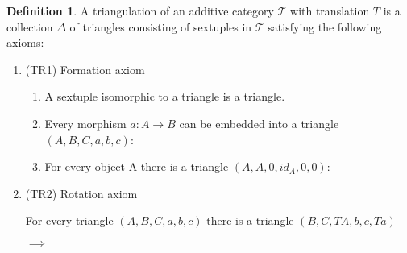 \documentclass[12pt]{article}
\theoremstyle{definition}
\newtheorem{definition}{Definition}[section]
\theoremstyle{remark}
\begin{document}
            \begin{definition}
                A triangulation of an additive category $\mathcal{T}$ with translation $T$ is a collection $\Delta$ of triangles consisting of sextuples in $\mathcal{T}$ satisfying the following axioms: 

                \begin{enumerate}
                    \item (TR1) Formation axiom

                        \begin{enumerate}
                            \item A sextuple isomorphic to a triangle is a triangle.
                            \item Every morphism $a : A \rightarrow B$ can be embedded into a triangle $(A,B,C,a,b,c)$:
                            \begin{center}
                            \end{center}
                            \item For every object A there is a triangle $(A,A,0,id_A,0,0)$:
                            \begin{center}
                            \end{center}
                        \end{enumerate}
                    \item (TR2) Rotation axiom

                        For every triangle $(A,B,C,a,b,c)$ there is a triangle $(B,C,TA,b,c,Ta)$
                        \begin{center}
                             $\implies$
                            

\end{center}
\end{enumerate}
\end{definition}
\end{document}
